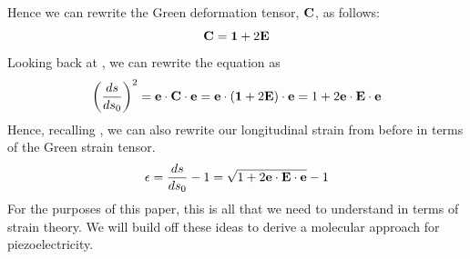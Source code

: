 Hence we can rewrite the Green deformation tensor, ${\bf{C}}$, as follows:
\begin{equation}
 {\bf{C}} = {\bf{1}} + 2{\bf{E}}
\end{equation}
Looking back at , we can rewrite the equation as
\begin{equation}
\label{eq:dsds022}
 \bigg(\frac{ds}{ds_0}\bigg)^2={\bf{e\cdot C \cdot e}}={{\bf{e}} \cdot ({\bf{1}} + 2{\bf{E}})\cdot {\bf{e}}} =
 1 + 2{\bf{e}\cdot \bf{E} \cdot \bf{e}}
\end{equation}
Hence, recalling , we can also rewrite our longitudinal strain from before in terms of the Green strain tensor.
\begin{equation}
\label{eq:longstrain_appendix2}
\epsilon=\frac{ds}{ds_0}-1= \sqrt{ 1 + 2{\bf{e}}\cdot \bf{E} \cdot \bf{e}} -1
\end{equation}
For the purposes of this paper, this is all that we need to understand in terms of strain theory. 
We will build off these ideas to derive a molecular approach for piezoelectricity.  
% 
% 
